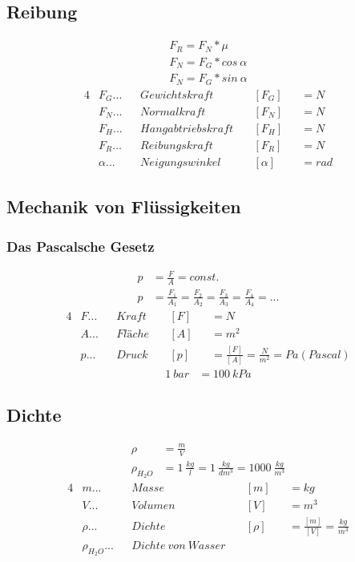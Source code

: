 \documentclass[12pt]{article}
\begin{document}
		\subsection{Reibung}
			\begin{align*}
				F_R = F_N * \mu \\
				F_N = F_G * cos\ \alpha \\
				F_N = F_G * sin\ \alpha
			\end{align*}
			\begin{alignat*}{4}
				&F_G    ...&&Gewichtskraft     &&\ [F_G]    &&= N \\
				&F_N    ...&&Normalkraft       &&\ [F_N]    &&= N \\
				&F_H    ...&&Hangabtriebskraft &&\ [F_H]    &&= N \\
				&F_R    ...&&Reibungskraft     &&\ [F_R]    &&= N \\
				&\alpha ...&&Neigungswinkel    &&\ [\alpha] &&= rad
			\end{alignat*}

		

		\subsection{Mechanik von Flüssigkeiten}
			\subsubsection{Das Pascalsche Gesetz}
				\begin{align*}
					p &= \frac{F}{A} = const. \\
					p &= \frac{F_1}{A_1} = \frac{F_2}{A_2} = \frac{F_3}{A_3} = \frac{F_4}{A_4} = ...
				\end{align*}
				\begin{alignat*}{4}
					&F...&&Kraft  &&\ [F] &&= N \\
					&A...&&Fläche &&\ [A] &&= m^2 \\
					&p...&&Druck  &&\ [p] &&= \frac{[F]}{[A]} = \frac{N}{m^2} = Pa (Pascal)
				\end{alignat*}
				\begin{align*}
					1\ bar &= 100\ kPa
				\end{align*}
		\subsection{Dichte}
			\begin{align*}
				\rho &= \frac{m}{V} \\
				\rho_{H_2O} &= 1\ \frac{kg}{l} = 1\ \frac{kg}{dm^3} = 1000\ \frac{kg}{m^3}
			\end{align*}
			\begin{alignat*}{4}
				&m   ...&&Masse   &&\ [m]    &&= kg \\
				&V   ...&&Volumen &&\ [V]    &&= m^3 \\
				&\rho...&&Dichte  &&\ [\rho] &&= \frac{[m]}{[V]} = \frac{kg}{m^3} \\
				&\rho_{H_2O}...&&Dichte\ von\ Wasser && &&
			\end{alignat*}
\end{document}
